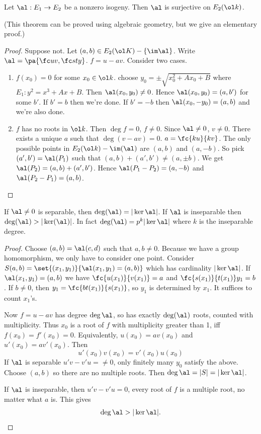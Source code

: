 \begin{thm}
Let $\al:E_1\to E_2$ be a nonzero isogeny. Then $\al$ is surjective on $E_2(\ol k)$.
\end{thm}
(This theorem can be proved using algebraic geometry, but we give an elementary proof.)
\begin{proof}
Suppose not. Let $(a,b)\in E_2(\ol K)-\{\im \al\}$.  Write $\al=\pa{\fc uv,\fc sty}$. $f=u-av$. Consider two cases.
\begin{enumerate}
\item
$f(x_0)=0$ for some $x_0\in \ol k$. choose $y_0=\pm \sqrt{x_0^2+Ax_0+B}$ where $E_1:y^2=x^3+Ax+B$. Then $\al(x_0,y_0)\ne 0$. Hence $\al(x_0,y_0)=(a,b')$ for some $b'$. If $b'=b$ then we're done. If $b'=-b$ then $\al(x_0,-y_0)=(a,b)$ and we're also done.
\item $f$ has no roots in $\ol k$. Then $\deg f=0$, $f\ne 0$. Since $\al\ne 0$, $v\ne 0$. There exists a unique $a$ such that $\deg(v-av)=0$. $a=\fc{ku}{kv}$. The only possible points in $E_2(\ol k)-\im (\al)$ are $(a,b)$ and $(a,-b)$. So pick $(a',b')=\al(P_1)$ such that $(a,b)+(a',b')\ne (a,\pm b)$. We get $\al(P_2)=(a,b)+(a',b')$. Hence $\al(P_1-P_2)=(a,-b)$ and $\al(P_2-P_1)=(a,b)$.
\end{enumerate}
\end{proof}
\begin{thm}
If $\al\ne 0$ is separable, then $\deg(\al)=|\ker \al|$. If $\al$ is inseparable then $\deg(\al)>|\ker(\al)|$. In fact $\deg(\al)=p^k|\ker \al|$ where $k$ is the inseparable degree.
\end{thm}
\begin{proof}
Choose $(a,b)=\al(c,d)$ such that $a,b\ne 0$. Because we have a group homomorphism, we only have to consider one point. Consider $S(a,b)=\set{(x_1,y_1)}{\al(x_1,y_1)=(a,b)}$ which has cardinality $|\ker\al|$. If $\al(x_1,y_1)=(a,b)$ we have $\fc{u(x_1)}{v(x_1)}=a$ and $\fc{s(x_1)}{t(x_1)}y_1=b$. If $b\ne 0$, then $y_1=\fc{bt(x_1)}{s(x_1)}$, so $y_1$ is determined by $x_1$. It suffices to count $x_1$'s.

Now $f=u-av$ has degree $\deg\al$, so has exactly $\deg(\al)$ roots, counted with multiplicity. Thus $x_0$ is a root of $f$ with multiplicity greater than 1, iff $f(x_0)=f'(x_0)=0$. Equivalently, $u(x_0)=av(x_0)$ and $u'(x_0)=av'(x_0)$. Then
\[
u'(x_0)v(x_0)=v'(x_0)u(x_0)
\]
If $\al$ is separable $u'v-v'u=\ne 0$, only finitely many $y_0$ satisfy the above. Choose $(a,b)$ so there are no multiple roots. Then $\deg \al=|S|=|\ker \al|$.

If $\al$ is inseparable, then $u'v-v'u=0$, every root of $f$ is a multiple root, no matter what $a$ is. This gives
\[
\deg\al>|\ker\al|.
\]
\end{proof}
